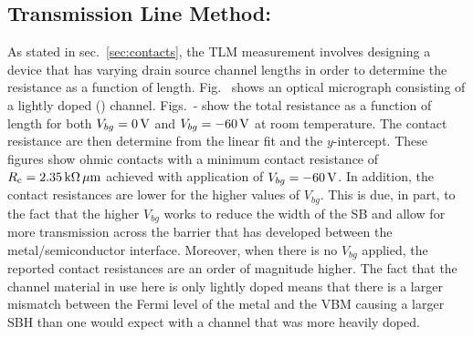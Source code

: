 \subsection{Transmission Line Method: \lightlyfive}\label{subsec:TLM_lightly}
As stated in sec.~\ref{sec:contacts}, the \acs{TLM} measurement involves designing a device that has varying drain source channel lengths in order to determine the resistance as a function of length. Fig.~ shows an optical micrograph consisting of a lightly doped  (\lightlyfive) channel. Figs.~- show the total resistance as a function of length for both $V_{bg}=0\,\mathrm{V}$ and $V_{bg}=-60\,\mathrm{V}$ at room temperature. The contact resistance are then determine from the linear fit and the $y$-intercept. These figures show ohmic contacts with a minimum contact resistance of $R_\mathrm{c}=2.35\,\mathrm{k\Omega}\,\mathrm{\mu m}$ achieved with application of $V_{bg}=-60\,\mathrm{V}$. In addition, the contact resistances are lower for the higher values of $V_{bg}$. This is due, in part, to the fact that the higher $V_{bg}$ works to reduce the width of the \acs{SB} and allow for more transmission across the barrier that has developed between the metal/semiconductor interface. Moreover, when there is no $V_{bg}$ applied, the reported contact resistances are an order of magnitude higher. The fact that the channel material in use here is only lightly doped means that there is a larger mismatch between the Fermi level of the metal and the \acs{VBM} causing a larger \acs{SBH} than one would expect with a channel that was more heavily doped.
